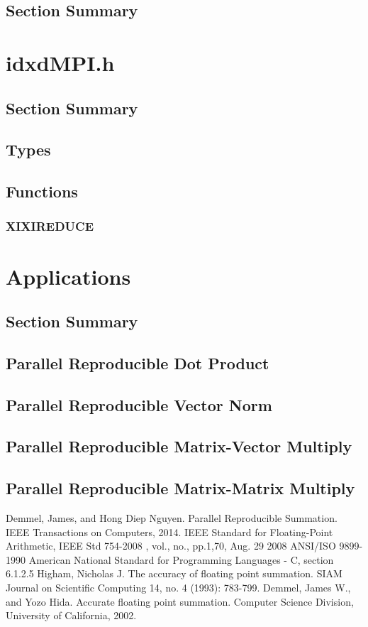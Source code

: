 \documentclass[12pt]{article}
\theoremstyle{definition}
\numberwithin{equation}{section}
\numberwithin{figure}{section}
\begin{document}
  \subsection{Section Summary}
\section{idxdMPI.h}
  \subsection{Section Summary}
  \subsection{Types}
  \subsection{Functions}
    \subsubsection{XIXIREDUCE}
\section{Applications}
  \subsection{Section Summary}
  \subsection{Parallel Reproducible Dot Product}
  \subsection{Parallel Reproducible Vector Norm}
  \subsection{Parallel Reproducible Matrix-Vector Multiply}
  \subsection{Parallel Reproducible Matrix-Matrix Multiply}
\begin{thebibliography}{9}
    Demmel, James, and Hong Diep Nguyen. Parallel Reproducible Summation. IEEE Transactions on Computers, 2014.
    IEEE Standard for Floating-Point Arithmetic, IEEE Std 754-2008 , vol., no., pp.1,70, Aug. 29 2008
    ANSI/ISO 9899-1990 American National Standard for Programming Languages - C, section 6.1.2.5
    Higham, Nicholas J. The accuracy of floating point summation. SIAM Journal on Scientific Computing 14, no. 4 (1993): 783-799.
    Demmel, James W., and Yozo Hida. Accurate floating point summation. Computer Science Division, University of California, 2002.
\end{thebibliography}
\end{document}
